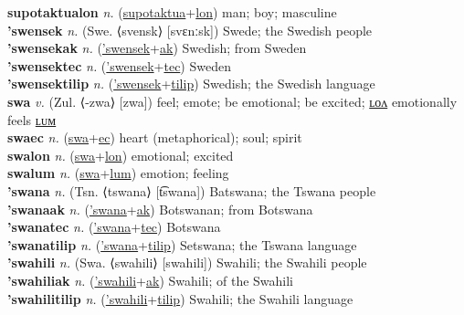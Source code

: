 \textbf{supotaktualon} \textit{n.} (\hyperref[supotaktua]{supotaktua}+\hyperref[lon]{lon})
man; boy; masculine \label{supotaktualon} \\
\textbf{'swensek} \textit{n.} (Swe. ⟨svensk⟩ [svɛnːsk])
Swede; the Swedish people \label{'swensek} \\
\textbf{'swensekak} \textit{n.} (\hyperref['swensek]{'swensek}+\hyperref[ak]{ak})
Swedish; from Sweden \label{'swensekak} \\
\textbf{'swensektec} \textit{n.} (\hyperref['swensek]{'swensek}+\hyperref[tec]{tec})
Sweden \label{'swensektec} \\
\textbf{'swensektilip} \textit{n.} (\hyperref['swensek]{'swensek}+\hyperref[tilip]{tilip})
Swedish; the Swedish language \label{'swensektilip} \\
\textbf{swa} \textit{v.} (Zul. ⟨-zwa⟩ [zwa])
feel; emote; be emotional; be excited; \hyperref[swalon]{ʟᴏᴧ} emotionally feels \hyperref[swalum]{ʟᴜᴍ} \label{swa} \\
\textbf{swaec} \textit{n.} (\hyperref[swa]{swa}+\hyperref[ec]{ec})
heart (metaphorical); soul; spirit \label{swaec} \\
\textbf{swalon} \textit{n.} (\hyperref[swa]{swa}+\hyperref[lon]{lon})
emotional; excited \label{swalon} \\
\textbf{swalum} \textit{n.} (\hyperref[swa]{swa}+\hyperref[lum]{lum})
emotion; feeling \label{swalum} \\
\textbf{'swana} \textit{n.} (Tsn. ⟨tswana⟩ [t͡swana])
Batswana; the Tswana people \label{'swana} \\
\textbf{'swanaak} \textit{n.} (\hyperref['swana]{'swana}+\hyperref[ak]{ak})
Botswanan; from Botswana \label{'swanaak} \\
\textbf{'swanatec} \textit{n.} (\hyperref['swana]{'swana}+\hyperref[tec]{tec})
Botswana \label{'swanatec} \\
\textbf{'swanatilip} \textit{n.} (\hyperref['swana]{'swana}+\hyperref[tilip]{tilip})
Setswana; the Tswana language \label{'swanatilip} \\
\textbf{'swahili} \textit{n.} (Swa. ⟨swahili⟩ [swahili])
Swahili; the Swahili people \label{'swahili} \\
\textbf{'swahiliak} \textit{n.} (\hyperref['swahili]{'swahili}+\hyperref[ak]{ak})
Swahili; of the Swahili \label{'swahiliak} \\
\textbf{'swahilitilip} \textit{n.} (\hyperref['swahili]{'swahili}+\hyperref[tilip]{tilip})
Swahili; the Swahili language \label{'swahilitilip} \\
